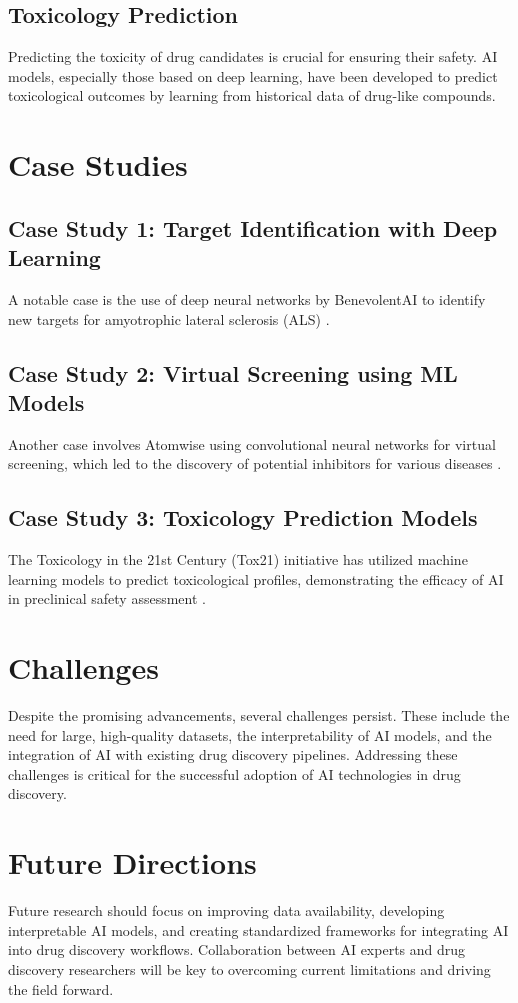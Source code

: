 \documentclass[12pt]{article}
\begin{document}
\subsection{Toxicology Prediction}
Predicting the toxicity of drug candidates is crucial for ensuring their safety. AI models, especially those based on deep learning, have been developed to predict toxicological outcomes by learning from historical data of drug-like compounds.

\section{Case Studies}
\subsection{Case Study 1: Target Identification with Deep Learning}
A notable case is the use of deep neural networks by BenevolentAI to identify new targets for amyotrophic lateral sclerosis (ALS) \cite{benevolentAI2020}.

\subsection{Case Study 2: Virtual Screening using ML Models}
Another case involves Atomwise using convolutional neural networks for virtual screening, which led to the discovery of potential inhibitors for various diseases \cite{atomwise2017}.

\subsection{Case Study 3: Toxicology Prediction Models}
The Toxicology in the 21st Century (Tox21) initiative has utilized machine learning models to predict toxicological profiles, demonstrating the efficacy of AI in preclinical safety assessment \cite{tox21}.

\section{Challenges}
Despite the promising advancements, several challenges persist. These include the need for large, high-quality datasets, the interpretability of AI models, and the integration of AI with existing drug discovery pipelines. Addressing these challenges is critical for the successful adoption of AI technologies in drug discovery.

\section{Future Directions}
Future research should focus on improving data availability, developing interpretable AI models, and creating standardized frameworks for integrating AI into drug discovery workflows. Collaboration between AI experts and drug discovery researchers will be key to overcoming current limitations and driving the field forward.
\end{document}
